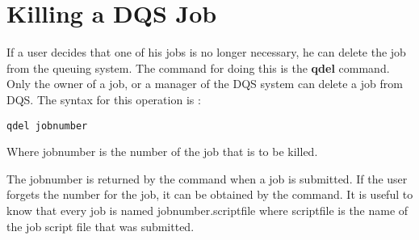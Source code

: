 \section{Killing a DQS Job}

If a user decides that one of his jobs is no longer necessary, he can
delete the job from the queuing system.  The command for doing this is
the {\bf qdel} command.  Only the owner of a job, or a manager of the
DQS system can delete a job from DQS.  The syntax for this operation
is :
\begin{verbatim}
qdel jobnumber
\end{verbatim}
Where jobnumber is the number of the job that is to be killed.

The jobnumber is returned by the \qsub command when a job is submitted.  If
the user forgets the number for the job, it can be obtained by the \qstat
command.  It is useful to know that every job is named jobnumber.scriptfile
where scriptfile is the name of the job script file that was submitted.
